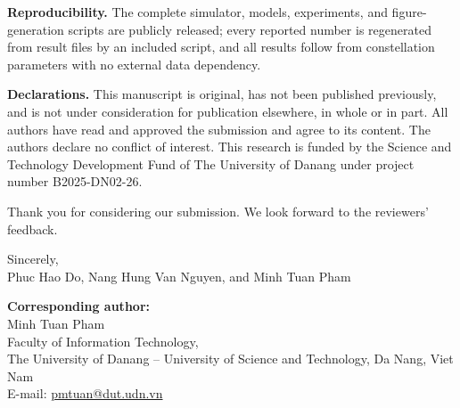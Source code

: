 \documentclass[11pt]{article}
\begin{document}
\textbf{Reproducibility.} The complete simulator, models, experiments, and
figure-generation scripts are publicly released; every reported number is regenerated from
result files by an included script, and all results follow from constellation parameters
with no external data dependency.

\textbf{Declarations.} This manuscript is original, has not been published previously, and
is not under consideration for publication elsewhere, in whole or in part. All authors have
read and approved the submission and agree to its content. The authors declare no conflict
of interest. This research is funded by the Science and Technology Development Fund of The
University of Danang under project number B2025-DN02-26.

Thank you for considering our submission. We look forward to the reviewers' feedback.

\bigskip
\noindent Sincerely,\\
Phuc Hao Do, Nang Hung Van Nguyen, and Minh Tuan Pham

\bigskip
\noindent\textbf{Corresponding author:}\\
Minh Tuan Pham\\
Faculty of Information Technology,\\
The University of Danang -- University of Science and Technology, Da Nang, Viet Nam\\
E-mail: \href{mailto:pmtuan@dut.udn.vn}{pmtuan@dut.udn.vn}
\end{document}
